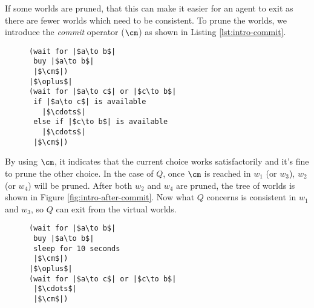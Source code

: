 If some worlds are pruned, that this can make it easier for an agent to exit
as there are fewer worlds which need to be consistent. 
To prune the worlds, we introduce the {\em commit} operator
($\cm$) as shown in Listing \ref{lst:intro-commit}. 

\begin{figure}[tb]
\begin{lstlisting}[caption=Commit. $\cm$ is the commit operator. Omitted lines are the same as in Listing \ref{lst:intro-speculate}.,label=lst:intro-commit]
(wait for |$a\to b$|
 buy |$a\to b$|
 |$\cm$|)
|$\oplus$|
(wait for |$a\to c$| or |$c\to b$|
 if |$a\to c$| is available
   |$\cdots$|
 else if |$c\to b$| is available
   |$\cdots$|
 |$\cm$|)
\end{lstlisting}
\end{figure}

By using $\cm$, it indicates that the current choice works satisfactorily
and it's fine to prune the other choice. 
In the case of $Q$, once $\cm$ is reached in $w_1$ (or $w_3$), 
$w_2$ (or $w_4$) will be pruned. 
After both $w_2$ and $w_4$ are pruned, 
the tree of worlds is shown in Figure \ref{fig:intro-after-commit}.
%
%
Now what $Q$ concerns is consistent in $w_1$ and $w_3$, 
so $Q$ can exit from the virtual worlds.

\begin{figure}[tb]
\begin{lstlisting}[caption=Preference. Omitted lines are the same as in Listing \ref{lst:intro-commit}.,label=lst:intro-commit-sleep]
(wait for |$a\to b$|
 buy |$a\to b$|
 sleep for 10 seconds
 |$\cm$|)
|$\oplus$|
(wait for |$a\to c$| or |$c\to b$|
 |$\cdots$|
 |$\cm$|)
\end{lstlisting}
\end{figure}

